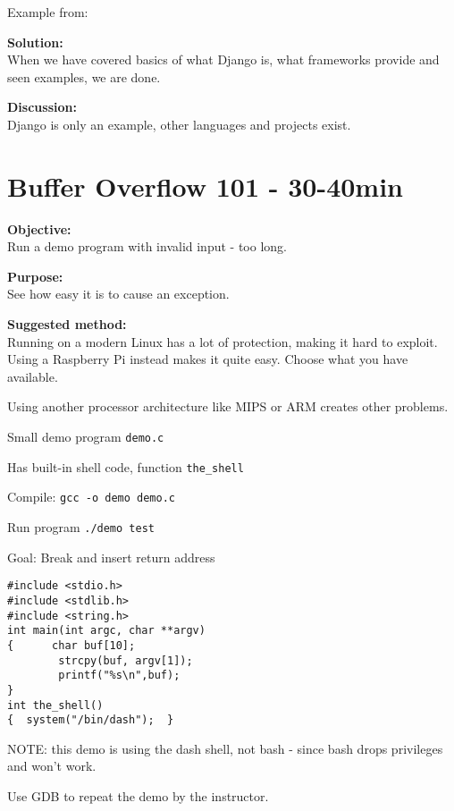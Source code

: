 \documentclass[a4paper,11pt,notitlepage]{report}
\begin{document}
Example from:

{\bf Solution:}\\
When we have covered basics of what Django is, what frameworks provide and seen examples, we are done.

{\bf Discussion:}\\
Django is only an example, other languages and projects exist.


\chapter{Buffer Overflow 101 - 30-40min}
\label{ex:bufferoverflow}


{\bf Objective:}\\
Run a demo program with invalid input - too long.

{\bf Purpose:}\\
See how easy it is to cause an exception.

{\bf Suggested method:}\\
Running on a modern Linux has a lot of protection, making it hard to exploit. Using a Raspberry Pi instead makes it quite easy. Choose what you have available.

Using another processor architecture like MIPS or ARM creates other problems.

\begin{list2}
\item Small demo program \verb+demo.c+
\item Has built-in shell code, function \verb+the_shell+
\item Compile:
\verb+gcc -o demo demo.c+
\item Run program
\verb+./demo test+
\item Goal: Break and insert return address
\end{list2}

\begin{verbatim}
#include <stdio.h>
#include <stdlib.h>
#include <string.h>
int main(int argc, char **argv)
{      char buf[10];
        strcpy(buf, argv[1]);
        printf("%s\n",buf);
}
int the_shell()
{  system("/bin/dash");  }
\end{verbatim}

NOTE: this demo is using the dash shell, not bash - since bash drops privileges and won't work.

Use GDB to repeat the demo by the instructor.
\end{document}
